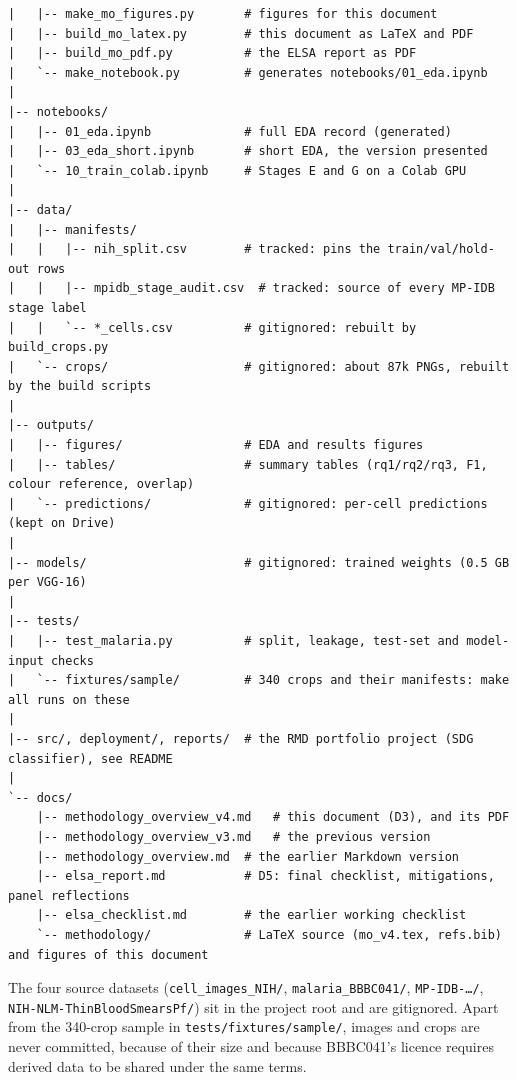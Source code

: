 \documentclass[11pt,a4paper]{article}
\begin{document}
\begin{Verbatim}[fontsize=\fontsize{6.5}{8}\selectfont,frame=none]
|   |-- make_mo_figures.py       # figures for this document
|   |-- build_mo_latex.py        # this document as LaTeX and PDF
|   |-- build_mo_pdf.py          # the ELSA report as PDF
|   `-- make_notebook.py         # generates notebooks/01_eda.ipynb
|
|-- notebooks/
|   |-- 01_eda.ipynb             # full EDA record (generated)
|   |-- 03_eda_short.ipynb       # short EDA, the version presented
|   `-- 10_train_colab.ipynb     # Stages E and G on a Colab GPU
|
|-- data/
|   |-- manifests/
|   |   |-- nih_split.csv        # tracked: pins the train/val/hold-out rows
|   |   |-- mpidb_stage_audit.csv  # tracked: source of every MP-IDB stage label
|   |   `-- *_cells.csv          # gitignored: rebuilt by build_crops.py
|   `-- crops/                   # gitignored: about 87k PNGs, rebuilt by the build scripts
|
|-- outputs/
|   |-- figures/                 # EDA and results figures
|   |-- tables/                  # summary tables (rq1/rq2/rq3, F1, colour reference, overlap)
|   `-- predictions/             # gitignored: per-cell predictions (kept on Drive)
|
|-- models/                      # gitignored: trained weights (0.5 GB per VGG-16)
|
|-- tests/
|   |-- test_malaria.py          # split, leakage, test-set and model-input checks
|   `-- fixtures/sample/         # 340 crops and their manifests: make all runs on these
|
|-- src/, deployment/, reports/  # the RMD portfolio project (SDG classifier), see README
|
`-- docs/
    |-- methodology_overview_v4.md   # this document (D3), and its PDF
    |-- methodology_overview_v3.md   # the previous version
    |-- methodology_overview.md  # the earlier Markdown version
    |-- elsa_report.md           # D5: final checklist, mitigations, panel reflections
    |-- elsa_checklist.md        # the earlier working checklist
    `-- methodology/             # LaTeX source (mo_v4.tex, refs.bib) and figures of this document
\end{Verbatim}

The four source datasets (\texttt{cell\_\allowbreak{}images\_\allowbreak{}NIH/\allowbreak{}}, \texttt{malaria\_\allowbreak{}BBBC041/\allowbreak{}}, \texttt{MP-IDB-…/\allowbreak{}}, \texttt{NIH-NLM-ThinBloodSmearsPf/\allowbreak{}}) sit in the project root and are gitignored. Apart from the 340-crop sample in \texttt{tests/\allowbreak{}fixtures/\allowbreak{}sample/\allowbreak{}}, images and crops are never committed, because of their size and because BBBC041's licence requires derived data to be shared under the same terms.
\end{document}
